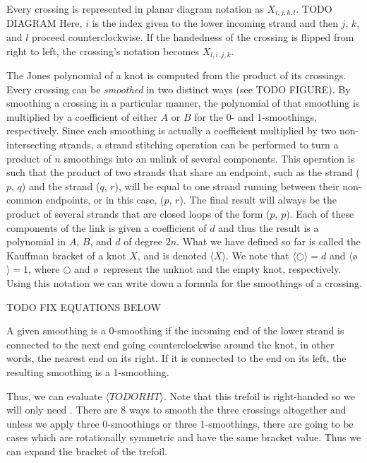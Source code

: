 \begin{paper}
Every crossing is represented in planar diagram notation as $X_{i,j,k,l}$. TODO
DIAGRAM
Here, $i$ is the index given to the lower incoming strand and then $j$, $k$, and
$l$ proceed counterclockwise.
If the handedness of the crossing is flipped from right to left, the crossing's
notation becomes $X_{l,i,j,k}$.


The Jones polynomial of a knot is computed from the product of its crossings.
Every crossing can be \textit{smoothed} in two distinct ways (see TODO FIGURE).
By smoothing a crossing in a particular manner, the polynomial of that smoothing
is multiplied by a coefficient of either $A$ or $B$ for the 0- and 1-smoothings,
respectively.
Since each smoothing is actually a coefficient multiplied by two
non-intersecting strands, a strand stitching operation can be performed to turn
a product of $n$ smoothings into an unlink of several components.
This operation is such that the product of two strands that share an endpoint,
such as the strand ($p$, $q$) and the strand ($q$, $r$), will be equal to one
strand running between their non-common endpoints, or in this case, ($p$, $r$).
The final result will always be the product of several strands that are closed
loops of the form ($p$, $p$).
Each of these components of the link is given a coefficient of $d$ and thus the
result is a polynomial in $A$, $B$, and $d$ of degree $2n$.
What we have defined so far is called the Kauffman bracket of a knot $X$, and is
denoted $\langle X\rangle$.
We note that $\langle\bigcirc\rangle=d$ and $\langle$\o$\rangle=1$, where
$\bigcirc$ and \o~represent the unknot and the empty knot, respectively.
Using this notation we can write down a formula for the smoothings of a
crossing.

TODO FIX EQUATIONS BELOW


A given smoothing is a 0-smoothing if the incoming end of the lower strand is
connected to the next end going counterclockwise around the knot, in other
words, the nearest end on its right.
If it is connected to the end on its left, the resulting smoothing is a
1-smoothing.

Thus, we can evaluate $\langle TODORHT\rangle$.
Note that this trefoil is right-handed so we will only need \eqBracketPlus.
There are 8 ways to smooth the three crossings altogether and unless we apply
three 0-smoothings or three 1-smoothings, there are going to be cases which are
rotationally symmetric and have the same bracket value.
Thus we can expand the bracket of the trefoil.


\end{paper}
